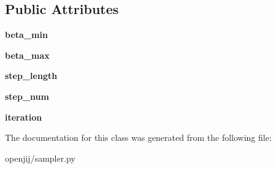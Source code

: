 \subsection*{Public Attributes}
\begin{DoxyCompactItemize}
\item 
\mbox{\label{classopenjij_1_1sampler_1_1_s_a_sampler_a72081e27093a01bddc7c3fbbd85bdc78}} 
{\bfseries beta\+\_\+min}
\item 
\mbox{\label{classopenjij_1_1sampler_1_1_s_a_sampler_aad5b1314c34ce5282d7b59c0adce7384}} 
{\bfseries beta\+\_\+max}
\item 
\mbox{\label{classopenjij_1_1sampler_1_1_s_a_sampler_ab4492125d36c34c3ceab484f516f414f}} 
{\bfseries step\+\_\+length}
\item 
\mbox{\label{classopenjij_1_1sampler_1_1_s_a_sampler_abc2f0b225904929b7dd866898e93779c}} 
{\bfseries step\+\_\+num}
\item 
\mbox{\label{classopenjij_1_1sampler_1_1_s_a_sampler_a043729d96b28ae3821301222f848da63}} 
{\bfseries iteration}
\end{DoxyCompactItemize}


The documentation for this class was generated from the following file\+:\begin{DoxyCompactItemize}
\item 
openjij/sampler.\+py\end{DoxyCompactItemize}
